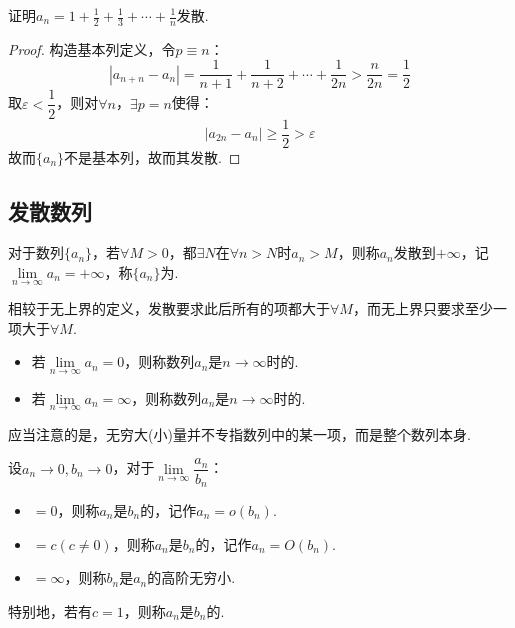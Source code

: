 \begin{question}
    证明$a_n = 1 + \frac{1}{2} + \frac{1}{3} + \cdots + \frac{1}{n}$发散.
\end{question}

\begin{proof}
    构造基本列定义，令$p \equiv n$：
    \[|a_{n+n} - a_n| = \frac{1}{n+1} + \frac{1}{n+2} + \cdots + \frac{1}{2n} > \frac{n}{2n} = \frac{1}{2}\]
    取$\varepsilon < \dfrac{1}{2}$，则对$\forall n$，$\exists p=n$使得：
    \[|a_{2n} - a_n| \geqslant \frac{1}{2} > \varepsilon\]
    故而$\{a_n\}$不是基本列，故而其发散.
\end{proof}


\subsection{发散数列}
\begin{definition}
    对于数列$\{a_n\}$，若$\forall M>0$，都$\exists N$在$\forall n>N$时$a_n > M$，则称$a_n$发散到$+\infty$，记$\lim\limits_{n \to \infty}a_n = +\infty$，称$\{a_n\}$为.
\end{definition}

相较于无上界的定义，发散要求此后所有的项都大于$\forall M$，而无上界只要求至少一项大于$\forall M$.

\begin{definition}
    \begin{itemize}
        \item 若$\lim\limits_{n\to\infty} a_n = 0$，则称数列$a_n$是$n\to\infty$时的.
        \item 若$\lim\limits_{n\to\infty} a_n = \infty$，则称数列$a_n$是$n\to\infty$时的.
    \end{itemize}
\end{definition}

应当注意的是，无穷大(小)量并不专指数列中的某一项，而是整个数列本身.

\begin{definition}
    设$a_n\to 0, b_n \to 0$，对于$\lim\limits_{n\to\infty}\dfrac{a_n}{b_n}$：
    \begin{itemize}
        \item $=0$，则称$a_n$是$b_n$的，记作$a_n = o(b_n)$.
        \item $=c(c \neq 0)$，则称$a_n$是$b_n$的，记作$a_n = O(b_n)$.
        \item $=\infty$，则称$b_n$是$a_n$的高阶无穷小.
    \end{itemize}
    特别地，若有$c=1$，则称$a_n$是$b_n$的.
\end{definition}

